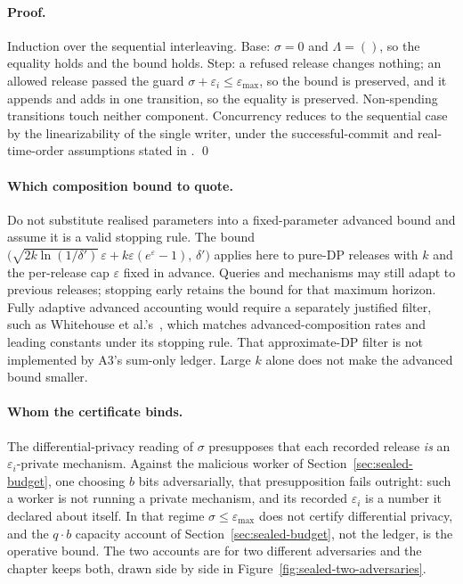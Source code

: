 \documentclass[11pt,a4paper]{article}
\theoremstyle{definition}
\begin{document}
\paragraph{Proof.}
Induction over the sequential interleaving. Base: $\sigma=0$ and
$\Lambda=()$, so the equality holds and the bound holds. Step: a refused
release changes nothing; an allowed release passed the guard
$\sigma+\varepsilon_i\le\varepsilon_{\max}$, so the bound is preserved, and it
appends and adds in one transition, so the equality is preserved. Non-spending
transitions touch neither component. Concurrency reduces to the sequential
case by the linearizability of the single writer, under the successful-commit and real-time-order assumptions stated in
. \qed

\paragraph{Which composition bound to quote.}
Do not substitute realised parameters into a fixed-parameter advanced bound
and assume it is a valid stopping rule. The bound
$\bigl(\sqrt{2k\ln(1/\delta')}\,\varepsilon+k\varepsilon(e^\varepsilon-1),\,\delta'\bigr)$
 applies here to pure-DP releases with $k$ and the per-release
cap $\varepsilon$ fixed in advance. Queries and mechanisms may still adapt to
previous releases; stopping early retains the bound for that maximum horizon.
Fully adaptive advanced accounting would require a
separately justified filter, such as Whitehouse et al.'s\ ,
which matches advanced-composition rates and leading constants under its
stopping rule. That approximate-DP filter is not implemented by A3's sum-only
ledger. Large $k$ alone does not make the advanced bound smaller.

\paragraph{Whom the certificate binds.}
The differential-privacy reading of $\sigma$ presupposes that each recorded
release \emph{is} an $\varepsilon_i$-private mechanism. Against the malicious
worker of Section~\ref{sec:sealed-budget}, one choosing $b$ bits
adversarially, that presupposition fails outright: such a worker is not
running a private mechanism, and its recorded $\varepsilon_i$ is a number it
declared about itself. In that regime $\sigma\le\varepsilon_{\max}$ does not
certify differential privacy, and the $q\cdot b$ capacity account of
Section~\ref{sec:sealed-budget}, not the ledger, is the operative bound. The
two accounts are for two different adversaries and the chapter keeps both,
drawn side by side in Figure~\ref{fig:sealed-two-adversaries}.
\end{document}
